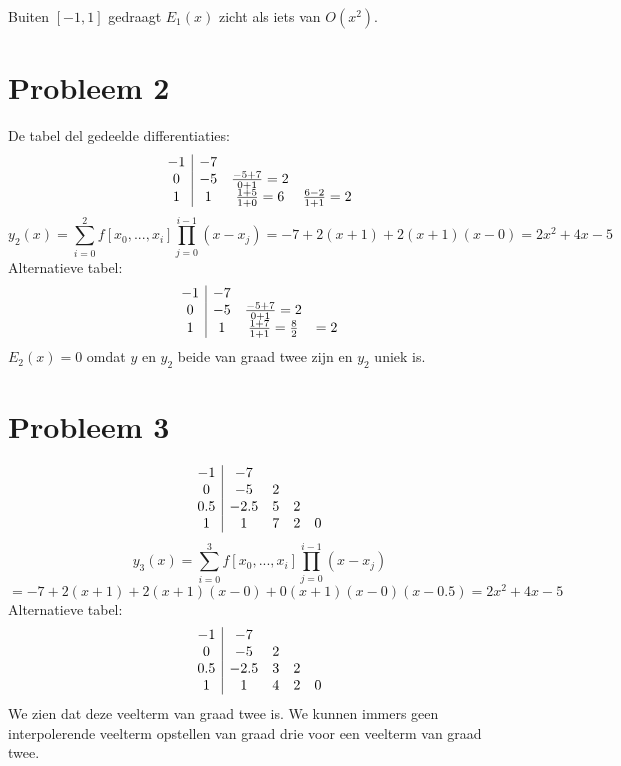 \documentclass[12pt,a4paper]{article}
\begin{document}
\begin{center}
\end{center}
Buiten $[-1,1]$ gedraagt $E_1(x)$ zicht als iets van $O(x^2)$.

\section{Probleem 2}
De tabel del gedeelde differentiaties:
\[
\begin{array}{c|c c c}
-1 & -7 & &\\
 0 & -5 & \frac{-5+7}{0+1} = 2 &\\
 1 &  1 & \frac{1+5}{1+0}  = 6 & \frac{6-2}{1+1} = 2\\
\end{array}
\]
\[
y_2(x) = \sum_{i=0}^{2}f[x_0,...,x_i]\prod_{j=0}^{i-1}(x-x_j)
= -7 + 2(x+1) + 2(x+1)(x-0)
= 2x^2+4x-5
\]
Alternatieve tabel:
\[
\begin{array}{c|c c c}
-1 & -7 & &\\
 0 & -5 & \frac{-5+7}{0+1} = 2 &\\
 1 &  1 & \frac{1+7}{1+1}  = \frac{8}{2} & = 2\\
\end{array}
\]
$E_2(x) = 0$ omdat $y$ en $y_2$ beide van graad twee zijn en $y_2$ uniek is.

\section{Probleem 3}
\[
\begin{array}{c|c c c c}
-1 & -7 & &\\
 0 & -5 & 2 &\\
0.5&-2.5& 5 & 2\\
 1 &  1 & 7 & 2 & 0\\
\end{array}
\]
\[
y_3(x) = \sum_{i=0}^{3}f[x_0,...,x_i]\prod_{j=0}^{i-1}(x-x_j)
\]
\[
= -7 + 2(x+1) + 2(x+1)(x-0) + 0(x+1)(x-0)(x-0.5)
= 2x^2+4x-5
\]
Alternatieve tabel:
\[
\begin{array}{c|c c c c}
-1 & -7 & &\\
 0 & -5 & 2 &\\
0.5&-2.5& 3 & 2\\
 1 &  1 & 4 & 2 & 0\\
\end{array}
\]
We zien dat deze veelterm van graad twee is.
We kunnen immers geen interpolerende veelterm opstellen van graad drie voor een veelterm van graad twee.
\end{document}
